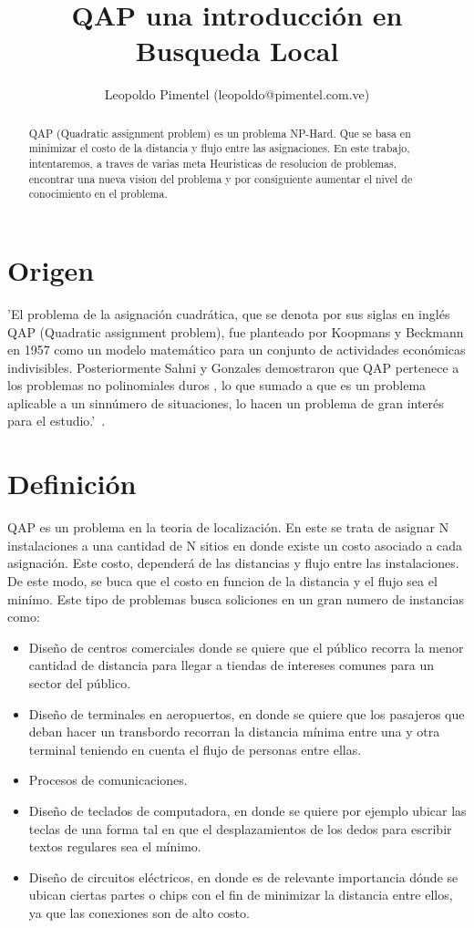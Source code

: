 \documentclass{ci5652}
\title{QAP una introducción en Busqueda Local}
\author{Leopoldo Pimentel (leopoldo@pimentel.com.ve)}
\begin{document}
\thispagestyle{empty}
\maketitle


\begin{abstract}
QAP (Quadratic assignment problem) es un problema NP-Hard. Que se basa en minimizar el costo de la distancia y flujo entre las asignaciones. En este trabajo, intentaremos, a traves de varias meta Heuristicas de resolucion de problemas, encontrar una nueva vision del problema y por consiguiente aumentar el nivel de conocimiento en el problema. 
\end{abstract}

\section{Origen}
\vspace*{0.2cm}'El problema de la asignación cuadrática, que se denota por sus siglas en inglés QAP (Quadratic assignment problem), fue planteado por Koopmans y Beckmann en 1957 como un modelo matemático para un conjunto de actividades económicas indivisibles. Posteriormente Sahni y Gonzales demostraron que QAP pertenece a los problemas no polinomiales duros , lo que sumado a que es un problema aplicable a un sinnúmero de situaciones, lo hacen un problema de gran interés para el estudio.'~\cite{so2005}.

\section{Definición}
\vspace*{0.2cm} QAP es un problema en la teoria de localización. En este se trata de asignar N instalaciones a una cantidad de N sitios en donde existe un costo asociado a cada asignación. Este costo, dependerá de las distancias y flujo entre las instalaciones. De este modo, se buca que el costo en funcion de la distancia y el flujo sea el minímo. 
Este tipo de problemas busca soliciones en un gran numero de instancias como:
\begin{itemize}
\item Diseño de centros comerciales donde se quiere que el público recorra la menor cantidad de distancia para llegar a tiendas de intereses comunes para un sector del público.
\item Diseño de terminales en aeropuertos, en donde se quiere que los pasajeros que deban hacer un transbordo recorran la distancia mínima entre una y otra terminal teniendo en cuenta el flujo de personas entre ellas.
\item Procesos de comunicaciones.
\item Diseño de teclados de computadora, en donde se quiere por ejemplo ubicar las teclas de una forma tal en que el desplazamientos de los dedos para escribir textos regulares sea el mínimo.
\item Diseño de circuitos eléctricos, en donde es de relevante importancia dónde se ubican ciertas partes o chips con el fin de minimizar la distancia entre ellos, ya que las conexiones son de alto costo.
\end{itemize}
\end{document}

